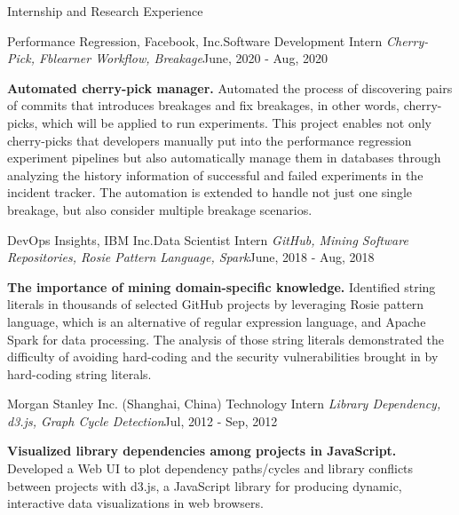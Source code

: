 \documentclass{professional} %
\begin{document}
\begin{rSection}{Internship and Research Experience}
\begin{rSubsection}{Performance Regression, Facebook, Inc.}{Software Development Intern}
{\it Cherry-Pick, Fblearner Workflow, Breakage}{June, 2020 - Aug, 2020}
\item {\bf Automated cherry-pick manager.} 
Automated the process of discovering pairs of commits that introduces breakages and fix breakages, in other words, cherry-picks, which will be applied to run experiments. This project enables not only cherry-picks that developers manually put into the performance regression experiment pipelines but also automatically manage them in databases through analyzing the history information of successful and failed experiments in the incident tracker. The automation is extended to handle not just one single breakage, but also consider multiple breakage scenarios. 
\end{rSubsection} 


\begin{rSubsection}{DevOps Insights, IBM Inc.}{Data Scientist Intern}
{\it GitHub, Mining Software Repositories, Rosie Pattern Language, Spark}{June, 2018 - Aug, 2018}
\item {\bf The importance of mining domain-specific knowledge.} 
Identified string literals in thousands of selected GitHub projects by leveraging Rosie pattern language, which is an alternative of regular expression language, and Apache Spark for data processing. The analysis of those string literals demonstrated the difficulty of avoiding hard-coding and the security vulnerabilities brought in by hard-coding string literals. 
\end{rSubsection} 


\begin{rSubsection}{Morgan Stanley Inc. (Shanghai, China) }{Technology Intern}
{\it Library Dependency, d3.js, Graph Cycle Detection}{Jul, 2012 - Sep, 2012}
\item {\bf Visualized library dependencies among projects in JavaScript.}
Developed a Web UI to plot dependency paths/cycles and library conflicts between projects with d3.js, a JavaScript library for producing dynamic, interactive data visualizations in web browsers.
\end{rSubsection} 


\end{rSection}
\end{document}
